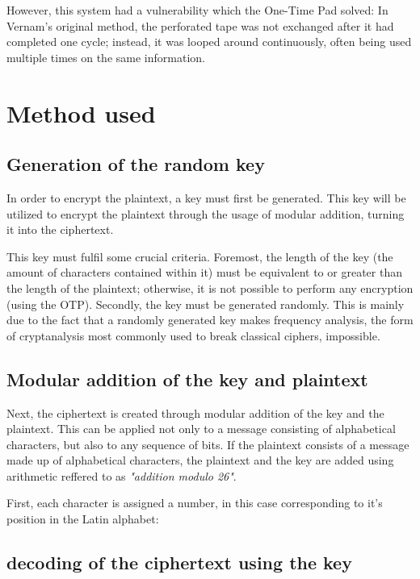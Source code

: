 \documentclass[12pt]{report}
\begin{document}
However, this system had a vulnerability which the One-Time Pad solved: In Vernam's original method, the perforated tape was not exchanged after it had completed one cycle; instead, it was looped around continuously, often being used multiple times on the same information.    

\section{Method used}

\subsection{Generation of the random key}
In order to encrypt the plaintext, a key must first be generated. This key will be utilized to encrypt the plaintext through the usage of modular addition, turning it into the ciphertext.

This key must fulfil some crucial criteria. Foremost, the length of the key (the amount of  characters contained within it) must be equivalent to or greater than the length of the plaintext; otherwise, it is not possible to perform any encryption (using the OTP). Secondly, the key must be generated randomly. This is mainly due to the fact that a randomly generated key makes frequency analysis\cite{frequencyanalysis}, the form of cryptanalysis most commonly used to break classical ciphers, impossible.

\subsection{Modular addition of the key and plaintext}
Next, the ciphertext is created through modular addition of the key and the plaintext. This can be applied not only to a message consisting of alphabetical characters, but also to any sequence of bits. If the plaintext consists of a message made up of alphabetical characters, the plaintext and the key are added using arithmetic reffered to as \textit{"addition modulo 26"}.

First, each character is assigned a number, in this case corresponding to it's position in the Latin alphabet:


\subsection{decoding of the ciphertext using the key}
\end{document}
